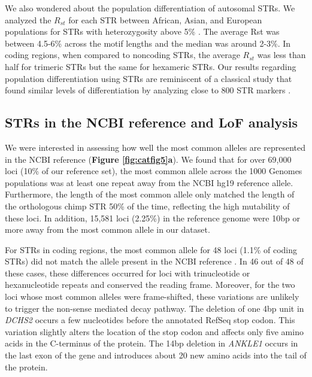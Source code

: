 We also wondered about the population differentiation of autosomal STRs. We analyzed the $R_{st}$ \cite{Slatkin1995} for each STR between African, Asian, and European populations for STRs with heterozygosity above 5\% \cite{SuppWillemsGymrekHighnamEtAl2014}. The average Rst was between 4.5-6\% across the motif lengths and the median was around 2-3\%. In coding regions, when compared to noncoding STRs, the average $R_{st}$ was less than half for trimeric STRs but the same for hexameric STRs. Our results regarding population differentiation using STRs are reminiscent of a classical study that found similar levels of differentiation by analyzing close to 800 STR markers \cite{RosenbergPritchardWeberEtAl2002}.

\subsection{STRs in the NCBI reference and LoF analysis}
We were interested in assessing how well the most common alleles are represented in the NCBI reference (\textbf{Figure \ref{fig:catfig5}a}). We found that for over 69,000 loci (10\% of our reference set), the most common allele across the 1000 Genomes populations was at least one repeat away from the NCBI hg19 reference allele. Furthermore, the length of the most common allele only matched the length of the orthologous chimp STR 50\% of the time, reflecting the high mutability of these loci. In addition, 15,581 loci (2.25\%) in the reference genome were 10bp or more away from the most common allele in our dataset.  

For STRs in coding regions, the most common allele for 48 loci (1.1\% of coding STRs) did not match the allele present in the NCBI reference \cite{SuppWillemsGymrekHighnamEtAl2014}. In 46 out of 48 of these cases, these differences occurred for loci with trinucleotide or hexanucleotide repeats and conserved the reading frame. Moreover, for the two loci whose most common alleles were frame-shifted, these variations are unlikely to trigger the non-sense mediated decay pathway. The deletion of one 4bp unit in \emph{DCHS2} occurs a few nucleotides before the annotated RefSeq stop codon. This variation slightly alters the location of the stop codon and affects only five amino acids in the C-terminus of the protein. The 14bp deletion in \emph{ANKLE1} occurs in the last exon of the gene and introduces about 20 new amino acids into the tail of the protein. 

